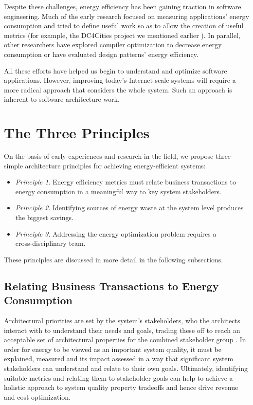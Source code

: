 Despite these challenges, energy efficiency has been gaining traction in software engineering. Much of the early research focused on measuring applications' energy consumption \cite{islam2016-energysoftwarefeatures} and tried to define useful work so as to allow the creation of useful metrics (for example, the DC4Cities project we mentioned earlier \cite{dc4cities2014_dcmetrics}). In parallel, other researchers have explored compiler optimization to decrease energy consumption or have evaluated design patterns' energy efficiency.

All these efforts have helped us begin to understand and optimize software applications. However, improving today's Internet-scale systems will require a more radical approach that considers the whole system. Such an approach is inherent to software architecture work.

\section{The Three Principles}

On the basis of early experiences and research in the field, we propose three simple architecture principles for achieving energy-efficient systems:

\begin{itemize}
\item \emph{Principle 1}. Energy efficiency metrics must relate business transactions to energy consumption in a meaningful way to key system stakeholders.
\item \emph{Principle 2}. Identifying sources of energy waste at the system level produces the biggest savings.
\item \emph{Principle 3}. Addressing the energy optimization problem requires a \\ cross-disciplinary team.
\end{itemize}

These principles are discussed in more detail in the following subsections. 

\subsection{Relating Business Transactions to Energy Consumption}

Architectural priorities are set by the system's stakeholders, who the architects interact with to understand their needs and goals, trading these off to reach an acceptable set of architectural properties for the combined stakeholder group \cite{rozanski2011-ssa2e}.  In order for energy to be viewed as an important system quality, it must be explained, measured and its impact assessed in a way that significant system stakeholders can understand and relate to their own goals.  Ultimately, identifying suitable metrics and relating them to stakeholder goals can help to achieve a holistic approach to system quality property tradeoffs and hence drive revenue and cost optimization.

